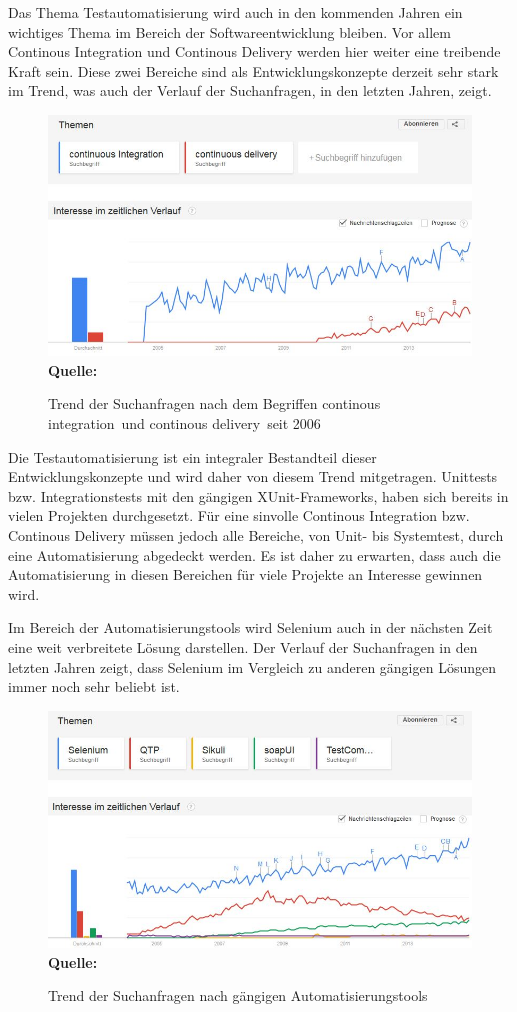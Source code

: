 Das Thema Testautomatisierung wird auch in den kommenden Jahren ein wichtiges Thema im Bereich der Softwareentwicklung bleiben. Vor allem Continous Integration und Continous Delivery werden hier weiter eine treibende Kraft sein. Diese zwei Bereiche sind als Entwicklungskonzepte derzeit sehr stark im Trend, was auch der Verlauf der Suchanfragen, in den letzten Jahren, zeigt.
\begin{figure}[htb]
  \centering  
  \includegraphics[scale=0.75]{img/cdTrend.JPG}\\
  \footnotesize\sffamily\textbf{Quelle:} \cite{google_google_2014}
  \caption{Trend der Suchanfragen nach dem Begriffen \glqq continous integration\grqq\ und \glqq continous delivery\grqq\ seit 2006}
  \label{fig:cdTrendTestauto}
\end{figure}
Die Testautomatisierung ist ein integraler Bestandteil dieser Entwicklungskonzepte und wird daher von diesem Trend mitgetragen. Unittests bzw. Integrationstests mit den gängigen XUnit-Frameworks, haben sich bereits in vielen Projekten durchgesetzt. Für eine sinvolle Continous Integration bzw. Continous Delivery müssen jedoch alle Bereiche, von Unit- bis Systemtest, durch eine Automatisierung abgedeckt werden. Es ist daher zu erwarten, dass auch die Automatisierung in diesen Bereichen für viele Projekte an Interesse gewinnen wird.


Im Bereich der Automatisierungstools wird Selenium auch in der nächsten Zeit eine weit verbreitete Lösung darstellen. Der Verlauf der Suchanfragen in den letzten Jahren zeigt, dass Selenium im Vergleich zu anderen gängigen Lösungen immer noch sehr beliebt ist.

\begin{figure}[htb]
  \centering  
  \includegraphics[scale=0.75]{img/autoToolsTrend.JPG}\\
  \footnotesize\sffamily\textbf{Quelle:} \cite{google_google_2014}
  \caption{Trend der Suchanfragen nach gängigen Automatisierungstools}
  \label{fig:cdTrendSelenium}
\end{figure}
